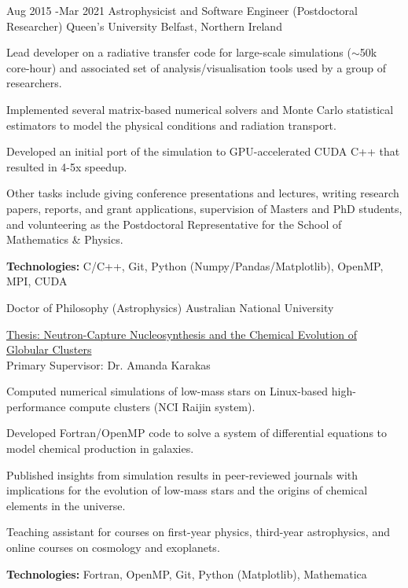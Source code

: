 \documentclass[11pt]{article} %
\begin{document}
\job
{Aug 2015 -}{Mar 2021}
{Astrophysicist and Software Engineer (Postdoctoral Researcher)}
{}
{Queen's University Belfast, Northern Ireland}
{\begin{itemize-noindent}
\item{Lead developer on a radiative transfer code for large-scale simulations ($\sim$50k core-hour) and associated set of analysis/visualisation tools used by a group of researchers.}
\item{Implemented several matrix-based numerical solvers and Monte Carlo statistical estimators to model the physical conditions and radiation transport.}
\item{Developed an initial port of the simulation to GPU-accelerated CUDA C++ that resulted in 4-5x speedup.}
\item{Other tasks include giving conference presentations and lectures, writing research papers, reports, and grant applications, supervision of Masters and PhD students, and volunteering as the Postdoctoral Representative for the School of Mathematics \& Physics.}
\end{itemize-noindent}
\textbf{Technologies:} C/C++, Git, Python (Numpy/Pandas/Matplotlib), OpenMP, MPI, CUDA\\
}

{Doctor of Philosophy (Astrophysics)}
{}{Australian National University}
{
\href{https://openresearch-repository.anu.edu.au/handle/1885/16507}{Thesis: Neutron-Capture Nucleosynthesis and the Chemical Evolution of Globular Clusters}\\
Primary Supervisor: Dr. Amanda Karakas
\begin{itemize-noindent}
  \item Computed numerical simulations of low-mass stars on Linux-based high-performance compute clusters (NCI Raijin system).
  \item Developed Fortran/OpenMP code to solve a system of differential equations to model chemical production in galaxies.
  \item Published insights from simulation results in peer-reviewed journals with implications for the evolution of low-mass stars and the origins of chemical elements in the universe.
  \item Teaching assistant for courses on first-year physics, third-year astrophysics, and online courses on cosmology and exoplanets.
\end{itemize-noindent}
\textbf{Technologies:} Fortran, OpenMP, Git, Python (Matplotlib), Mathematica
}
\end{document}
